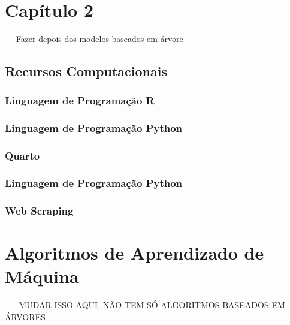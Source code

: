 \documentclass[
  12pt,
  letterpaper,
  DIV=11,
  numbers=noendperiod]{scrreprt}
\begin{document}
\newpage

\chapter{Capítulo 2}\label{capuxedtulo-2}

--- Fazer depois dos modelos baseados em árvore ---

\section{Recursos Computacionais}\label{recursos-computacionais}

\subsection{Linguagem de Programação
R}\label{linguagem-de-programauxe7uxe3o-r}

\subsection{Linguagem de Programação
Python}\label{linguagem-de-programauxe7uxe3o-python}

\subsection{Quarto}\label{quarto}

\subsection{Linguagem de Programação
Python}\label{linguagem-de-programauxe7uxe3o-python-1}

\subsection{Web Scraping}\label{web-scraping}

\newpage

\chapter{Algoritmos de Aprendizado de
Máquina}\label{algoritmos-de-aprendizado-de-muxe1quina}

---- MUDAR ISSO AQUI, NÃO TEM SÓ ALGORITMOS BASEADOS EM ÁRVORES ----
\end{document}
